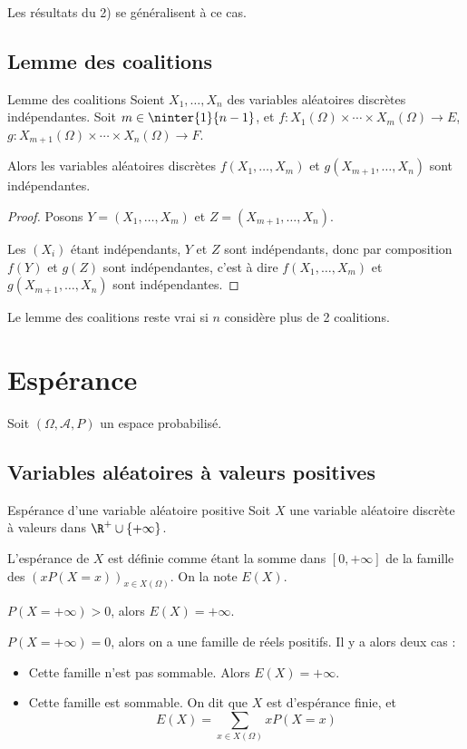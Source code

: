 Les résultats du 2) se généralisent à ce cas. 

\subsection{Lemme des coalitions} 

\begin{theoreme}{Lemme des coalitions}{}
    Soient $X_1, \dots, X_n$ des variables aléatoires discrètes indépendantes. 
    Soit $m \in \ninter{1}{n - 1}$, et $f : X_1(\Omega) \times \cdots \times X_m(\Omega) \to E$,
    $g : X_{m + 1}(\Omega) \times \cdots \times X_n(\Omega) \to F$.

    Alors les variables aléatoires discrètes $f(X_1, \dots, X_m)$ et $g(X_{m + 1}, \dots, X_n)$ sont indépendantes.
\end{theoreme}

\begin{proof}
    Posons $Y = (X_1, \dots, X_m)$ et $Z = (X_{m + 1}, \dots, X_n)$.

    Les $(X_i)$ étant indépendants, $Y$ et $Z$ sont indépendants, donc par composition $f(Y)$ et $g(Z)$ sont indépendantes,
    c'est à dire $f(X_1, \dots, X_m)$ et $g(X_{m + 1}, \dots, X_n)$ sont indépendantes.
\end{proof}

\begin{proposition}{}{}
    Le lemme des coalitions reste vrai si $n$ considère plus de 2 coalitions. 
\end{proposition}

\section{Espérance}
Soit $(\Omega, \mathcal A, P)$ un espace probabilisé. 

\subsection{Variables aléatoires à valeurs positives}

\begin{definition}{Espérance d'une variable aléatoire positive}{}
    Soit $X$ une variable aléatoire discrète à valeurs dans $\R^+ \cup \{+\infty\}$.

    L'espérance de $X$ est définie comme étant la somme dans $[0, + \infty]$ 
    de la famille des $(x P(X = x) )_{x \in X(\Omega)}$. On la note $E(X)$.

     $P(X = + \infty) > 0$, alors $E(X) = + \infty$.

     $P(X = + \infty) = 0$, alors on a une famille de réels positifs. 
    Il y a alors deux cas : 
    \begin{itemize}
        \item Cette famille n'est pas sommable. Alors $E(X) = + \infty$.
        \item Cette famille est sommable. On dit que $X$ est d'espérance finie, et 
        $$ E(X) = \sum_{x \in X(\Omega)} x P(X = x) $$
    \end{itemize}
\end{definition}

